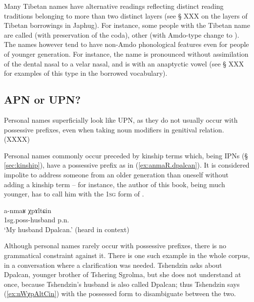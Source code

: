 Many Tibetan names have alternative readings reflecting distinct reading traditions belonging to more than two distinct layers (see § XXX on the layers of Tibetan borrowings in Japhug). For instance, some people with the Tibetan name  are called  (with preservation of the coda), other  (with Amdo-type change to ). The names however tend to have non-Amdo phonological features even for people of younger generation. For instance, the name  is pronounced  without assimilation of the dental nasal to a velar nasal, and   is  with an anaptyctic vowel (see § XXX for examples of this type in the borrowed vocabulary).  


\subsection{APN or UPN?} \label{sec:personal.name.APN}
Personal names superficially look like UPN, as they do not usually occur with possessive prefixes, even when taking noun modifiers in genitival relation. (XXXX)

Personal names commonly occur preceded by kinship terms which, being IPNs (§ \ref{sec:kinship}), have a possessive prefix as in (\ref{ex:anmaR.dpalcan}). It is considered impolite to address someone from an older generation than oneself without adding a kinship term -- for instance, the author of this book, being much younger, has to call him  with the \textsc{1sg} form of .

\begin{exe}
\ex \label{ex:anmaR.dpalcan}
\gll a-nmaʁ χpɤltɕin \\
1sg.poss-husband p.n. \\
\glt `My husband Dpalcan.' (heard in context)
\end{exe}

Although personal names rarely occur with possessive prefixes, there is no grammatical constraint against it. There is one such example in the whole corpus, in a conversation where a clarification was needed. Tshendzin asks about Dpalcan, younger brother of Tshering Sgrolma, but she does not understand at once, because Tshendzin's husband is also called Dpalcan; thus Tshendzin says (\ref{ex:nWχpAltCin}) with the possessed form  to disambiguate between the two.

